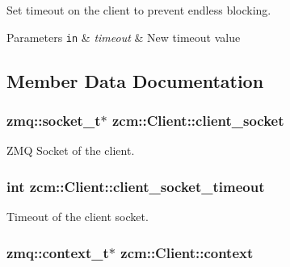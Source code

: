 Set timeout on the client to prevent endless blocking. 


\begin{DoxyParams}[1]{Parameters}
\mbox{\tt in}  & {\em timeout} & New timeout value \\
\hline
\end{DoxyParams}


\subsection{Member Data Documentation}
\hypertarget{classzcm_1_1Client_a022f5e131d58cea7f6cc49b4580940a0}{
\subsubsection[{client\-\_\-socket}]{\setlength{\rightskip}{0pt plus 5cm}zmq\-::socket\-\_\-t$\ast$ zcm\-::\-Client\-::client\-\_\-socket\hspace{0.3cm}{\ttfamily [private]}}}\label{classzcm_1_1Client_a022f5e131d58cea7f6cc49b4580940a0}


Z\-M\-Q Socket of the client. 

\hypertarget{classzcm_1_1Client_a25fa4ff78b8e962ca8436a8815bf7924}{
\subsubsection[{client\-\_\-socket\-\_\-timeout}]{\setlength{\rightskip}{0pt plus 5cm}int zcm\-::\-Client\-::client\-\_\-socket\-\_\-timeout\hspace{0.3cm}{\ttfamily [private]}}}\label{classzcm_1_1Client_a25fa4ff78b8e962ca8436a8815bf7924}


Timeout of the client socket. 

\hypertarget{classzcm_1_1Client_a0519b850f2a5167a0636f7a7adcabe1e}{
\subsubsection[{context}]{\setlength{\rightskip}{0pt plus 5cm}zmq\-::context\-\_\-t$\ast$ zcm\-::\-Client\-::context\hspace{0.3cm}{\ttfamily [private]}}}\label{classzcm_1_1Client_a0519b850f2a5167a0636f7a7adcabe1e}


